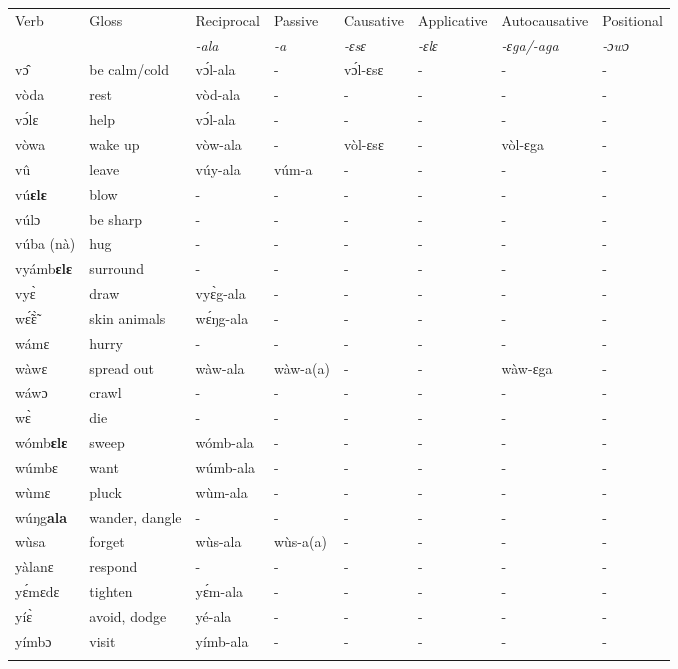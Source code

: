 \begin{sidewaystable}
\begin{tabular}{llllllll}
 \lsptoprule
 Verb & Gloss & Reciprocal & Passive  & Causative  & Applicative   & Autocausative & Positional   \\
  &    & {\itshape -ala} & {\itshape -a} & {\itshape -ɛsɛ} & {\itshape -ɛlɛ} & {\itshape -ɛga/-aga}  & {\itshape -ɔwɔ}  \\
\midrule
vɔ̂ & be calm/cold & vɔ́l-ala & - & vɔ́l-ɛsɛ & - & - & - \\
vòda & rest & vòd-ala & - & - & - & - & - \\
vɔ́lɛ & help & vɔ́l-ala & - & - & - & - & - \\
vòwa & wake up & vòw-ala & - & vòl-ɛsɛ & - &  vòl-ɛga & - \\
vû & leave & vúy-ala & vúm-a & - & - & - & - \\
vú{\bfseries ɛlɛ} & blow & - & - & - & - & - & - \\
vúlɔ & be sharp & - & - & - & - & - & - \\
vúba (nà) & hug & - & - & - & - & - & - \\
 vyámb{\bfseries ɛlɛ} & surround & - & - & - & - & - & - \\
vyɛ̀ & draw & vyɛ̀g-ala & - & - & -  & - & - \\
wɛ̃́ɛ̃̀ & skin animals & wɛ́ŋg-ala & - & - & - & - & - \\
wámɛ & hurry & - & - & - & - & - & - \\
wàwɛ & spread out & wàw-ala & wàw-a(a) & - & - & wàw-ɛga & - \\
wáwɔ & crawl & - & - &  - & - & - & - \\
wɛ̀ & die & - & - &  - & - & - & - \\
wómb{\bfseries ɛlɛ} & sweep & wómb-ala & - & - & - & - & - \\
wúmbɛ & want & wúmb-ala & - & - & -  & - & - \\
wùmɛ & pluck & wùm-ala & - & - & -  & - & - \\
wúŋg{\bfseries ala} & wander, dangle & - & - & - & - & - & - \\
wùsa & forget & wùs-ala & wùs-a(a) & - & - & - & - \\
yàlanɛ & respond & - & - & - & - & - & - \\
yɛ́mɛdɛ & tighten & yɛ́m-ala  & - & - & - & - & - \\
yíɛ̀ & avoid, dodge & yé-ala & - & - & - & - & - \\
yímbɔ & visit & yímb-ala & - & - & - & - & - \\
\lspbottomrule\end{tabular}\end{sidewaystable}

